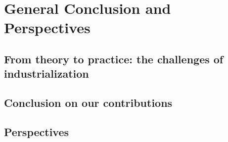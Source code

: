 
\chapter{General Conclusion and Perspectives}
\label{chapter:conclusion}

\section{From theory to practice: the challenges of industrialization}
\section{Conclusion on our contributions}
\section{Perspectives}
